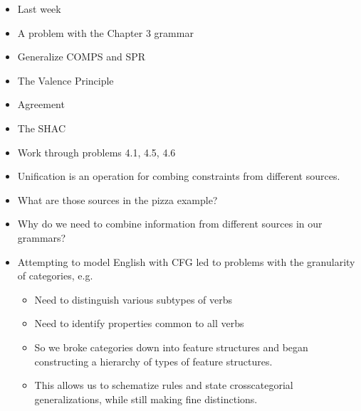 \documentclass[a4paper,landscape,headrule,footrule,dvips]{foils}
\begin{document}
\avmfont{\it}

\maketitle


\begin{itemize}
\item Last week
\item A problem with the Chapter 3 grammar
\item Generalize COMPS and SPR
\item The Valence Principle
\item Agreement
\item The SHAC
\item Work through problems 4.1, 4.5, 4.6
\end{itemize}

\MyLogo{}
\begin{itemize}
\item Unification is an operation for combing
constraints from different sources.

\item What are those sources in the pizza
example?

\item Why do we need to combine information
from different sources in our grammars?
\end{itemize}

\begin{itemize}
\item Attempting to model English with CFG led to problems
  with the granularity of categories, e.g.
  \begin{itemize}
  \item Need to distinguish various subtypes of verbs
  \item Need to identify properties common to all verbs
  \end{itemize}
\begin{itemize}
\item So we broke categories down into feature structures and
  began constructing a hierarchy of types of feature
  structures.
\item This allows us to schematize rules and state crosscategorial
  generalizations, while still making fine distinctions.
\end{itemize}
\end{itemize}
\end{document}
